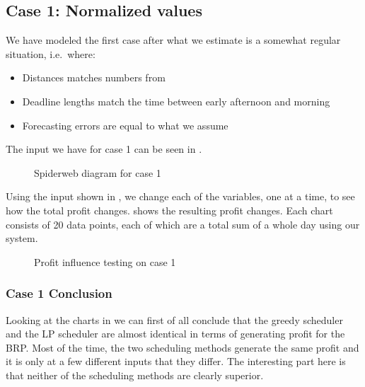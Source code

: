 \subsection{Case 1: Normalized values} 
We have modeled the first case after what we estimate is a somewhat regular situation, i.e.\ where: 
\begin{itemize}
	\item Distances matches numbers from~\cite[p.~52]{TRAFIKSTYRELSEN2010}
	\item Deadline lengths match the time between early afternoon and morning 
	\item Forecasting errors are equal to what we assume
\end{itemize} 

The input we have for case 1 can be seen in . 
\begin{figure}[!htb]
	\centering
	
	\caption{Spiderweb diagram for case 1}\label{fig:case1spiderweb}
\end{figure}

Using the input shown in , we change each of the variables, one at a time, to see how the total profit changes.  shows the resulting profit changes. Each chart consists of 20 data points, each of which are a total sum of a whole day using our system.

\begin{figure}[!htb]
	\centering
	
	\caption{Profit influence testing on case 1}\label{fig:test_case1}
\end{figure}

\subsubsection{Case 1 Conclusion}
Looking at the charts in  we can first of all conclude that the greedy scheduler and the LP scheduler are almost identical in terms of generating profit for the BRP. Most of the time, the two scheduling methods generate the same profit and it is only at a few different inputs that they differ. The interesting part here is that neither of the scheduling methods are clearly superior. 

